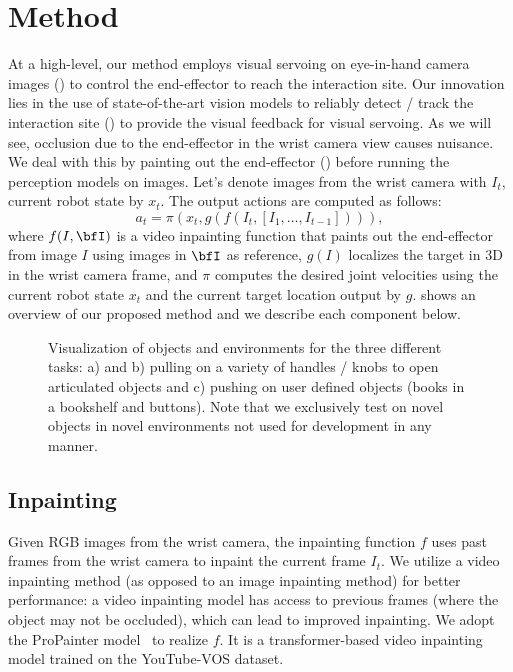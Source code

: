 \section{Method}
At a high-level, our method employs visual servoing on eye-in-hand camera images
() to control the end-effector to reach the interaction
site. Our innovation lies in the use of state-of-the-art vision models to
reliably detect / track the interaction site () to provide
the visual feedback for visual servoing. As we will see, occlusion due to the
end-effector in the wrist camera view causes nuisance. We deal with this by
painting out the end-effector () before running the perception
models on images.  Let's denote images from the wrist camera with $I_t$,
current robot state by $x_t$. The output actions are computed as follows:
\begin{equation}
a_t = \pi\left(x_t, g\left(f\left(I_t, [I_1, \ldots, I_{t-1}]\right)\right)\right),
\end{equation}
where $f(I, \bfI)$ is a video inpainting function that paints out the
end-effector from image $I$ using images in $\bfI$ as reference, $g(I)$
localizes the target in 3D in the wrist camera frame, and $\pi$ computes the
desired joint velocities using the current robot state $x_t$ and the current
target location output by $g$.  shows an overview of our
proposed method and we describe each component below.

\begin{figure*}
\caption{Visualization of objects and environments for the three different tasks: a) and b) pulling on a variety of handles / knobs to open articulated objects and c) pushing on user defined objects (books in a bookshelf and buttons). Note that we exclusively test on novel objects in novel environments not used for development in any manner.}
\end{figure*}

\subsection{Inpainting}
Given RGB images from the wrist camera, the inpainting function $f$ uses past
frames from the wrist camera to inpaint the current frame $I_t$. 
We utilize a video inpainting method (as opposed to an image inpainting method)
for better performance: a video inpainting model has access to previous frames
(where the object may not be occluded), which can lead to improved
inpainting. We adopt the ProPainter model~\cite{zhou2023propainter} to realize $f$. It is a transformer-based video inpainting model trained on the YouTube-VOS
\cite{xu2018youtube} dataset.

